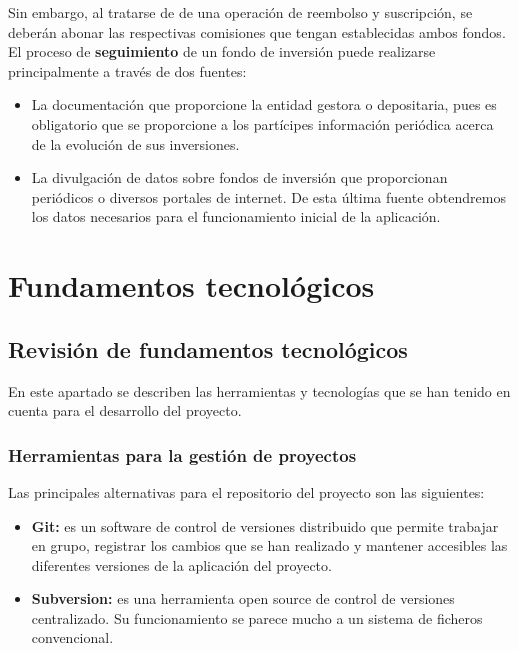 \documentclass[12pt, a4paper]{book}
\begin{document}
Sin embargo, al tratarse de de una operación de reembolso y suscripción, se deberán abonar las respectivas comisiones que tengan establecidas ambos fondos.\\ 

El proceso de \textbf{seguimiento} de un fondo de inversión puede realizarse principalmente a través de dos fuentes:
\begin{itemize}
	\item La documentación que proporcione la entidad gestora o depositaria, pues es obligatorio que se proporcione a los partícipes información periódica acerca de la evolución de sus inversiones.
	\item La divulgación de datos sobre fondos de inversión que proporcionan periódicos o diversos portales de internet. De esta última fuente obtendremos los datos necesarios para el funcionamiento inicial de la aplicación.
\end{itemize}

\newpage 


\chapter{Fundamentos tecnológicos}

\section{Revisión de fundamentos tecnológicos}

En este apartado se describen las herramientas y tecnologías que se han tenido en cuenta para el desarrollo del proyecto.

\subsection{Herramientas para la gestión de proyectos}

Las principales alternativas para el repositorio del proyecto son las siguientes:

\begin{itemize}
	
	\item \textbf{Git:} es un software de control de versiones distribuido que permite trabajar en grupo, registrar los cambios que se han realizado y mantener accesibles las diferentes versiones de la aplicación del proyecto.
	
	\item \textbf{Subversion:} es una herramienta open source de control de versiones centralizado. Su funcionamiento se parece mucho a un sistema de ficheros convencional.
	
\end{itemize}	
\end{document}
